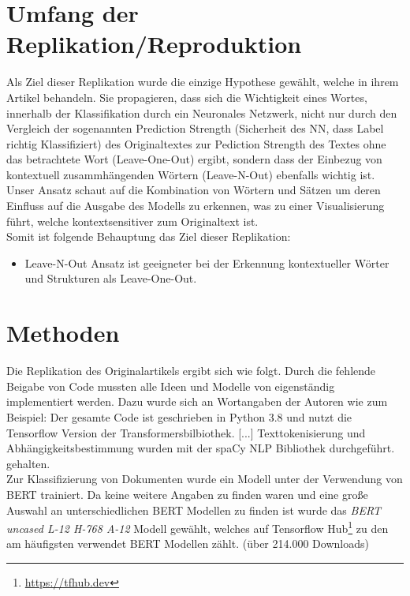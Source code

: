 \documentclass[DIV=13,fontsize=11pt]{scrartcl}
\begin{document}
\section{Umfang der Replikation/Reproduktion}

Als Ziel dieser Replikation wurde die einzige Hypothese gewählt, welche
\citeauthor{dunn2021context} in ihrem Artikel behandeln. Sie propagieren,
dass sich die Wichtigkeit eines Wortes, innerhalb der Klassifikation durch ein
Neuronales Netzwerk, nicht nur durch den Vergleich der sogenannten
Prediction Strength (Sicherheit des NN, dass Label richtig Klassifiziert)
des Originaltextes zur Pediction Strength des Textes ohne das betrachtete Wort (Leave-One-Out)
ergibt, sondern dass der Einbezug von kontextuell zusammhängenden Wörtern (Leave-N-Out)
ebenfalls wichtig ist. \glqq Unser Ansatz schaut auf die Kombination von
Wörtern und Sätzen um deren Einfluss auf die Ausgabe des Modells zu erkennen,
was zu einer Visualisierung führt, welche kontextsensitiver zum Originaltext ist.
\grqq~\cite{dunn2021context}\\

Somit ist folgende Behauptung das Ziel dieser Replikation:

\begin{itemize}
    \item Leave-N-Out Ansatz ist geeigneter bei der Erkennung kontextueller Wörter und Strukturen als Leave-One-Out.
\end{itemize}

\section{Methoden}

Die Replikation des Originalartikels ergibt sich wie folgt. Durch die
fehlende Beigabe von Code mussten alle Ideen und Modelle von \citeauthor{dunn2021context}
eigenständig implementiert werden. Dazu wurde sich an Wortangaben
der Autoren wie zum Beispiel:
\glqq Der gesamte Code ist geschrieben in Python 3.8 und nutzt die Tensorflow Version
der Transformersbilbiothek. [...] Texttokenisierung und Abhängigkeitsbestimmung wurden
mit der spaCy NLP Bibliothek durchgeführt.\grqq~\cite{dunn2021context} gehalten.\\

Zur Klassifizierung von Dokumenten wurde ein Modell unter der Verwendung von BERT trainiert.
Da keine weitere Angaben zu finden waren und eine große Auswahl an unterschiedlichen
BERT Modellen zu finden ist wurde das \textit{BERT uncased L-12 H-768 A-12} Modell gewählt,
welches auf Tensorflow Hub\footnote{\url{https://tfhub.dev}} zu den am häufigsten verwendet
BERT Modellen zählt. (über 214.000 Downloads)\\
\end{document}
